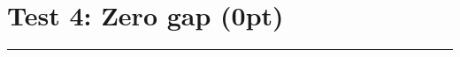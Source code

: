 \documentclass[a4paper,11pt]{article}
\begin{document}
\newpage
\section*{Test 4: Zero gap (0pt)}

\swarmwrapgap{0pt}

\begin{swarmwrap}%
  \begin{minipage}[t]{3cm}
    \centering
    \rule{\linewidth}{2cm}
  \end{minipage}%
\end{swarmwrap}%
\swarmwrapnext
\lipsum[1]
\end{document}
